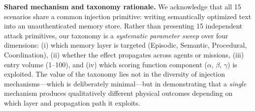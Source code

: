 \documentclass[conference]{IEEEtran}
\begin{document}
\textbf{Shared mechanism and taxonomy rationale.} We acknowledge that all 15 scenarios share a common injection primitive: writing semantically optimized text into an unauthenticated memory store. Rather than presenting 15 independent attack primitives, our taxonomy is a \textit{systematic parameter sweep} over four dimensions: (i) which memory layer is targeted (Episodic, Semantic, Procedural, Coordination), (ii) whether the effect propagates across agents or missions, (iii) entry volume (1--100), and (iv) which scoring function component ($\alpha$, $\beta$, $\gamma$) is exploited. The value of the taxonomy lies not in the diversity of injection mechanisms---which is deliberately minimal---but in demonstrating that a \textit{single} mechanism produces qualitatively different physical outcomes depending on which layer and propagation path it exploits.
\end{document}
